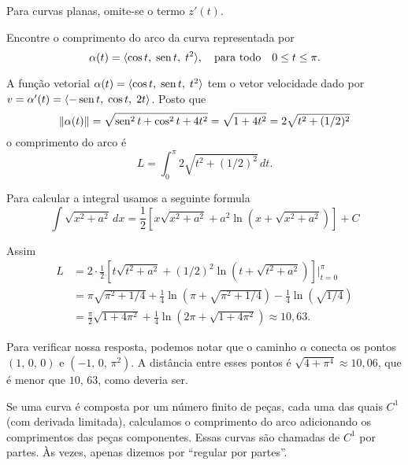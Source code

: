 Para curvas planas, omite-se o termo \(z'(t)\).


\begin{exc}
Encontre o comprimento do arco da curva representada por
 \begin{equation*}
 \alpha(t)=\langle \cos t,\; \operatorname{sen} t,\; t^{2} \rangle,\quad\text{para todo}\quad   0 \leq t  \leq \pi.
 \end{equation*}
\end{exc}

\solo
A função vetorial \(\alpha(t) = \langle \cos t,\; \operatorname{sen} t,\; t^{2}\rangle \) tem o vetor velocidade dado por
\(v =\alpha'(t)= \langle -\operatorname{sen} t, \; \cos t,\;  2t\rangle \). Posto que
\begin{equation*}
  \|\alpha(t)\|=\sqrt{\operatorname{sen}^{2} t+\cos^{2} t+4t^{2}}=\sqrt{1+4t^{2}}=2\sqrt{t^{2}+(1/2)^{2}}
\end{equation*}
o comprimento do arco é
\begin{equation*}
L=\int_{0}^{\pi}2\sqrt{t^{2}+(1/2)^{2}}\, dt.
\end{equation*}

Para calcular a integral usamos a seguinte formula
\begin{equation*}
\int \sqrt{x^{2}+a^{2}}\, dx =\frac{1}{2}\left[x\sqrt{x^{2}+a^{2}}+a^{2}\ln\left(x+\sqrt{x^{2}+a^{2}}  \right) \right]+C
\end{equation*}

Assim
\begin{align*}
  L & = 2\cdot\frac{1}{2}\left[t\sqrt{t^{2}+a^{2}}+(1/2)^{2}\ln \left(t+\sqrt{t^{2}+a^{2}} \right) \right]\Bigg\vert_{t=0}^{\pi} \\[2ex]
   & = \pi \sqrt{\pi^{2}+1/4}+\frac{1}{4}\ln \left(\pi+\sqrt{\pi^{2}+1/4}\right)-\frac{1}{4}\ln\left(\sqrt{{1}/{4}} \right)\\[2ex]
   & = \frac{\pi}{2}\sqrt{1+4\pi^{2}}+\frac{1}{4}\ln\left(2\pi +\sqrt{1+4\pi^{2}}\right) \approx 10,63.
\end{align*}

Para verificar nossa resposta, podemos notar que o caminho \(\alpha\) conecta os pontos \((1,\, 0,\, 0)\) e \((-1,\,
0,\, \pi^{2})\). A distância entre esses pontos é \(\sqrt{4 + \pi^{4}} \approx 10,06\), que é menor que \(10, \, 63\),
como deveria ser.

\bigskip
Se uma curva é composta por um número finito de peças, cada uma das quais \(C^{1}\) (com derivada limitada), calculamos o comprimento do arco adicionando os comprimentos das peças componentes. Essas curvas são chamadas de \(C^{1}\) por partes. Às vezes, apenas dizemos por ``regular por partes''.


